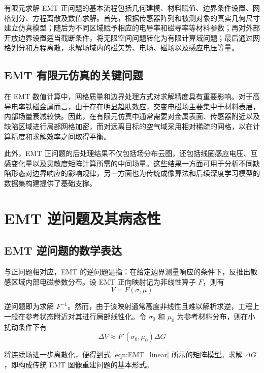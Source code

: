 有限元求解 EMT 正问题的基本流程包括几何建模、材料赋值、边界条件设置、网格划分、方程离散及数值求解。首先，根据传感器阵列和被测对象的真实几何尺寸建立仿真模型；随后为不同区域赋予相应的电导率和磁导率等材料参数；再对外部开放边界设置适当截断条件，将无限空间问题转化为有限计算域问题；最后通过网格划分和方程离散，求解场域内的磁矢势、电场、磁场以及感应电压等量。

\subsection{EMT 有限元仿真的关键问题}

在 EMT 数值计算中，网格质量和边界处理方式对求解精度具有重要影响。对于高导电率铁磁金属而言，由于存在明显趋肤效应，交变电磁场主要集中于材料表层，内部场量衰减较快。因此，在有限元仿真中通常需要对金属表面、传感器附近以及缺陷区域进行局部网格加密，而对远离目标的空气域采用相对稀疏的网格，以在计算精度和求解效率之间取得平衡。

此外，EMT 正问题的后处理结果不仅包括场分布云图，还包括线圈感应电压、互感变化量以及灵敏度矩阵计算所需的中间场量。这些结果一方面可用于分析不同缺陷形态对边界响应的影响规律，另一方面也为传统成像算法和后续深度学习模型的数据集构建提供了基础支撑。

\section{EMT 逆问题及其病态性}

\subsection{EMT 逆问题的数学表达}

与正问题相对应，EMT 的逆问题是指：在给定边界测量响应的条件下，反推出敏感区域内部电磁参数分布。设 EMT 正向映射记为非线性算子 $F$，则有
\begin{equation}
\label{eqn:forward_operator}
V = F(\sigma,\mu)
\end{equation}

逆问题即为求解 $F^{-1}$。然而，由于该映射通常高度非线性且难以解析求逆，工程上一般在参考状态附近对其进行局部线性化。令 $\sigma_0$ 和 $\mu_0$ 为参考材料分布，则在小扰动条件下有
\begin{equation}
\label{eqn:linearization}
\Delta V \approx F'(\sigma_0,\mu_0)\Delta G
\end{equation}

将连续场进一步离散化，便得到式 \eqref{eqn:EMT_linear} 所示的矩阵模型。求解 $\Delta G$，即构成传统 EMT 图像重建问题的基本形式。


